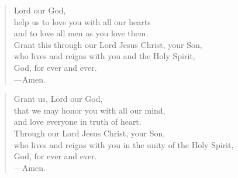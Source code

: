 \prayer

\setlength{\leftmargini}{\prayerleftmargini}

\begin{verse}
Lord our God,\\
help us to love you with all our hearts\\
and to love all men as you love them.\\
Grant this through our Lord Jesus Christ, your Son,\\
who lives and reigns with you and the Holy Spirit,\\
God, for ever and ever.\\
{\color{red}---\thinspace}Amen.
\end{verse}


\begin{verse}
Grant us, Lord our God,\\
that we may honor you with all our mind,\\
and love everyone in truth of heart.\\
Through our Lord Jesus Christ, your Son,\\
who lives and reigns with you in the unity of the Holy Spirit,\\
God, for ever and ever.\\
{\color{red}---\thinspace}Amen.
\end{verse}

\setlength{\leftmargini}{\defleftmargini}